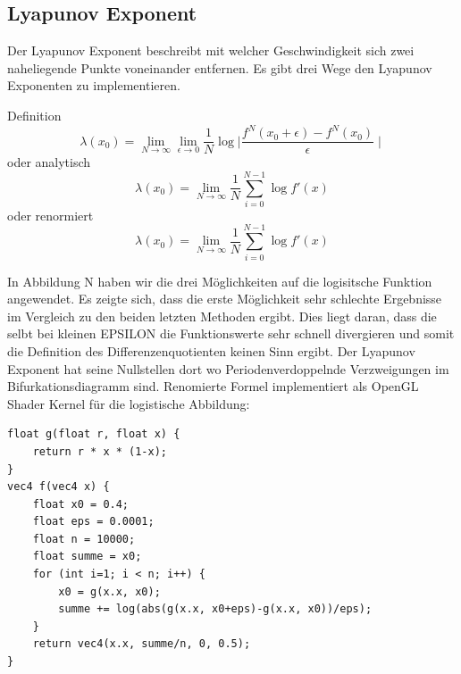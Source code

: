 \documentclass{scrartcl}
\begin{document}
\subsection{Lyapunov Exponent}
Der Lyapunov Exponent beschreibt mit welcher Geschwindigkeit sich zwei naheliegende Punkte voneinander entfernen. 
Es gibt drei Wege den Lyapunov Exponenten zu implementieren.

Definition
$$\lambda(x_0) = \lim_{N \rightarrow \infty}\lim_{\epsilon \rightarrow 0} \frac{1}{N}\log{\mid \frac{f^N(x_0+\epsilon)- f^N(x_0)}{\epsilon} \mid} $$
oder analytisch
$$\lambda(x_0) = \lim_{N \rightarrow \infty} \frac{1}{N} \sum_{i=0}^{N-1}  \log{f'(x)} $$
oder renormiert
$$\lambda(x_0) = \lim_{N \rightarrow \infty} \frac{1}{N} \sum_{i=0}^{N-1}  \log{f'(x)} $$


In Abbildung N haben wir die drei Möglichkeiten auf die logisitsche Funktion angewendet. Es zeigte sich, dass die erste Möglichkeit sehr schlechte Ergebnisse im Vergleich zu den beiden letzten Methoden ergibt. Dies liegt daran, dass die selbt bei kleinen EPSILON die Funktionswerte sehr schnell divergieren und somit die Definition des Differenzenquotienten keinen Sinn ergibt. 
Der Lyapunov Exponent hat seine Nullstellen dort wo Periodenverdoppelnde Verzweigungen im Bifurkationsdiagramm sind. 
Renomierte Formel implementiert als OpenGL Shader Kernel für die logistische Abbildung:
\begin{lstlisting}
float g(float r, float x) {
    return r * x * (1-x);
}
vec4 f(vec4 x) {
    float x0 = 0.4;
    float eps = 0.0001;
    float n = 10000;
    float summe = x0;
    for (int i=1; i < n; i++) {
        x0 = g(x.x, x0);
        summe += log(abs(g(x.x, x0+eps)-g(x.x, x0))/eps);
    }
    return vec4(x.x, summe/n, 0, 0.5);
}
\end{lstlisting}
 
\end{document}
